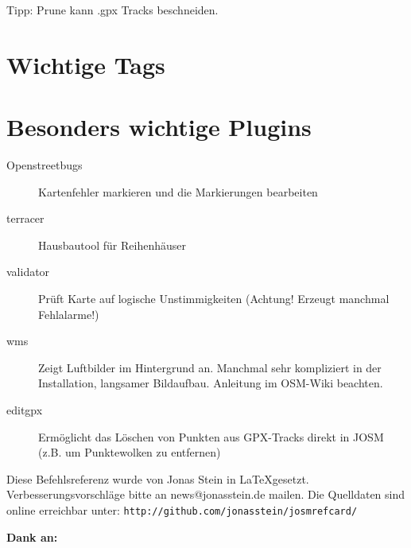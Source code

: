 \documentclass[a4paper,11pt,notumble]{leaflet}
\begin{document}
Tipp: Prune kann .gpx Tracks beschneiden. 


\newpage
\section*{Wichtige Tags}

\section*{Besonders wichtige Plugins}
\begin{description}
\item[Openstreetbugs] Kartenfehler markieren und die Markierungen bearbeiten
\item[terracer] Hausbautool für Reihenhäuser
\item[validator] Prüft Karte auf logische Unstimmigkeiten
(Achtung! Erzeugt manchmal Fehlalarme!) 
\item[wms] Zeigt Luftbilder im Hintergrund an. Manchmal sehr kompliziert in der Installation, langsamer Bildaufbau. 
Anleitung im OSM-Wiki beachten.
\item[editgpx] Ermöglicht das Löschen von Punkten aus GPX-Tracks direkt in JOSM (z.B. um Punktewolken zu entfernen)
\end{description}

\newpage
Diese Befehlsreferenz wurde von Jonas Stein in \LaTeX gesetzt.
Verbesserungsvorschläge bitte an news@jonasstein.de mailen.
Die Quelldaten sind online erreichbar unter: \texttt{http://github.com/jonasstein/josmrefcard/}

\textbf{Dank an:} %
\end{document}
